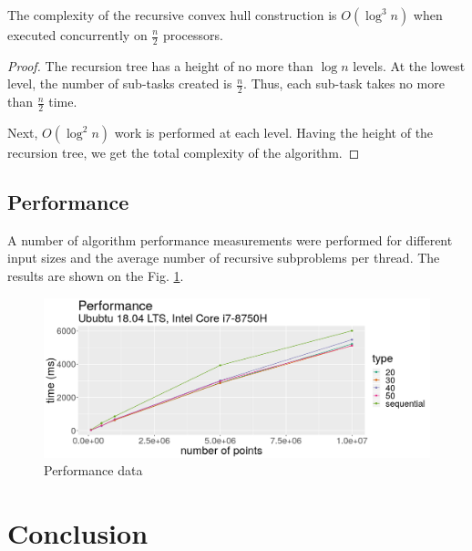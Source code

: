 \documentclass[a4paper,UKenglish,cleveref, autoref]{socg-lipics-v2019}
\begin{document}
	\begin{theorem}
		The complexity of the recursive convex hull construction is $O(\log^3n)$ when executed concurrently on $\frac{n}{2}$ processors.
	\end{theorem}
	
	\begin{proof}
		The recursion tree has a height of no more than $\log n$ levels. At the lowest level, the number of sub-tasks created is $\frac{n}{2}$. Thus, each sub-task takes no more than $\frac{n}{2}$ time.
		
		Next, $O(\log^2 n)$ work is performed at each level. Having the height of the recursion tree, we get the total complexity of the algorithm.
	\end{proof}	


\subsection{Performance}



	A number of algorithm performance measurements were performed for different input sizes and the average number of recursive subproblems per thread. The results are shown on the Fig. \ref{fig:performance}.
	
	\begin{figure}[h]
		\centering
		\includegraphics[width=1\textwidth, height=0.4\textheight]{performance}
		\caption{Performance data}
		\label{fig:performance}
	\end{figure}


\section{Conclusion}
\label{sec:coclusion}
\end{document}
